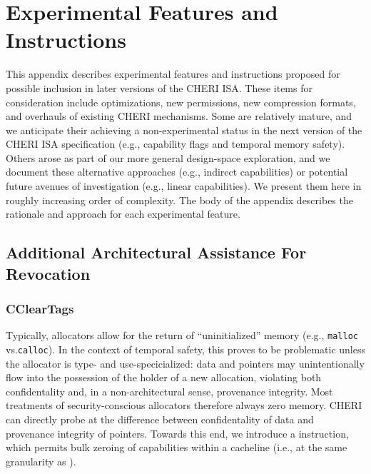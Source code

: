 \chapter{Experimental Features and Instructions}
\label{app:experimental}

This appendix describes experimental features and instructions proposed for
possible inclusion in later versions of the CHERI ISA.
These items for consideration include optimizations, new permissions, new
compression formats, and overhauls of existing CHERI mechanisms.
Some are relatively mature, and we anticipate their achieving a
non-experimental status in the next version of the CHERI ISA specification
(e.g., capability flags and temporal memory safety).
Others arose as part of our more general design-space exploration, and we
document these alternative approaches (e.g., indirect capabilities) or
potential future avenues of investigation (e.g., linear capabilities).
We present them here in roughly increasing order of complexity.
The body of the appendix describes the rationale and approach for each
experimental feature.

\section{Additional Architectural Assistance For Revocation} %

\subsection{CClearTags} %

Typically, allocators allow for the return of ``uninitialized'' memory
(e.g., \texttt{malloc} vs.\@ \texttt{calloc}).  In the context of temporal
safety, this proves to be problematic unless the allocator is type- and
use-specicialized: data and pointers may unintentionally flow into the
possession of the holder of a new allocation, violating both confidentality
and, in a non-architectural sense, provenance integrity.  Most treatments of
security-conscious allocators therefore always zero memory.  CHERI can
directly probe at the difference between confidentality of data and
provenance integrity of pointers.  Towards this end, we introduce a
 instruction, which permits bulk zeroing of
capabilities within a cacheline (i.e., at the same granularity as
).


